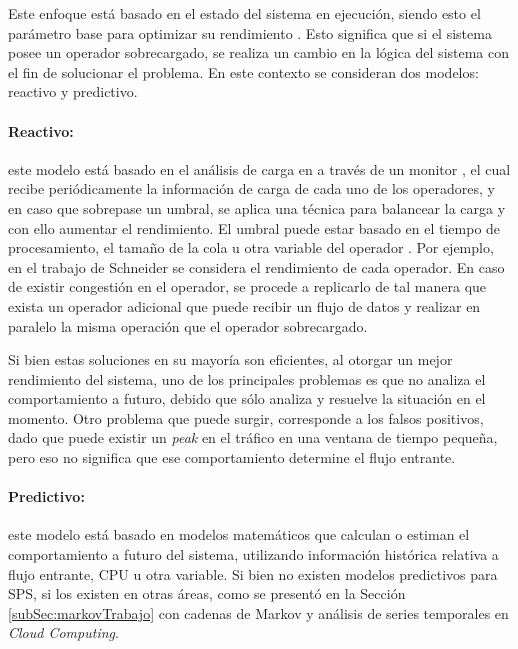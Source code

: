 Este enfoque está basado en el estado del sistema en ejecución, siendo esto el parámetro base para optimizar su rendimiento \citep{CasavantK88}. Esto significa que si el sistema posee un operador sobrecargado, se realiza un cambio en la lógica del sistema con el fin de solucionar el problema. En este contexto se consideran dos modelos: reactivo y predictivo.

\paragraph{Reactivo:} este modelo está basado en el análisis de carga en a través de un monitor \citep{GulisanoJPSV12}, el cual recibe periódicamente la información de carga de cada uno de los operadores, y en caso que sobrepase un umbral, se aplica una técnica para balancear la carga y con ello aumentar el rendimiento. El umbral puede estar basado en el tiempo de procesamiento, el tamaño de la cola u otra variable del operador \citep{BhuvanagiriGKS06}. Por ejemplo, en el trabajo de Schneider \citep{SchneiderAGBW09} se considera el rendimiento de cada operador. En caso de existir congestión en el operador, se procede a replicarlo de tal manera que exista un operador adicional que puede recibir un flujo de datos y realizar en paralelo la misma operación que el operador sobrecargado.

Si bien estas soluciones en su mayoría son eficientes, al otorgar un mejor rendimiento del sistema, uno de los principales problemas es que no analiza el comportamiento a futuro, debido que sólo analiza y resuelve la situación en el momento. \normalsize{Otro problema que puede surgir, corresponde a los falsos positivos, dado que puede existir un \textit{peak} en el tráfico en una ventana de tiempo pequeña, pero eso no significa que ese comportamiento determine el flujo entrante.}

\paragraph{Predictivo:} este modelo está basado en modelos matemáticos que calculan o estiman el comportamiento a futuro del sistema, utilizando información histórica relativa a flujo entrante, CPU u otra variable. Si bien no existen modelos predictivos para SPS, si los existen en otras áreas, como se presentó en la Sección \ref{subSec:markovTrabajo} con cadenas de Markov y análisis de series temporales en \textit{Cloud Computing}.

